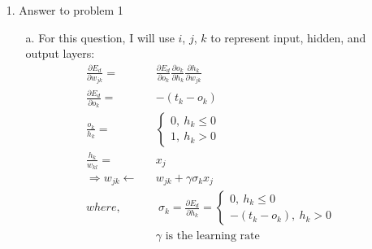 \begin{enumerate}
\item[1.] Answer to problem 1
	\begin{enumerate}
	\item[a.]
		For this question, I will use $i$, $j$, $k$ to represent input, hidden, and output layers:
		\begin{eqnarray}
		\frac{\partial E_d}{\partial w_{jk}} = && \frac{\partial E_d}{\partial o_k} \frac{\partial o_k}{\partial h_k} \frac{\partial h_k}{\partial w_{jk}}\\
		\frac{\partial E_d}{\partial o_k} = && -(t_k - o_k)\\
		\frac{o_k}{h_k} = && 
			\begin{cases}
			0, \: h_k \leq 0\\
			1, \: h_k > 0
			\end{cases}\\
		\frac{h_k}{w_{kl}} = && x_j\\
		\Rightarrow w_{jk} \leftarrow && w_{jk} + \gamma \sigma_k x_j\\
		where, && \: \sigma_k = \frac{\partial E_d}{\partial h_k} = 
			\begin{cases}
			0, \: h_k\leq0\\
			-(t_k-o_k), \: h_k>0
			\end{cases}\\
		&& \gamma \text{ is the learning rate}
		\end{eqnarray}


\end{enumerate}
\end{enumerate}

